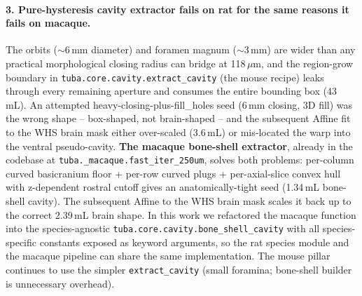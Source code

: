 \documentclass{compactarticle}
\begin{document}
\paragraph{3. Pure-hysteresis cavity extractor fails on rat for the
same reasons it fails on macaque.} The orbits (${\sim}6$\,mm
diameter) and foramen magnum (${\sim}3$\,mm) are wider than any
practical morphological closing radius can bridge at 118\,$\mu$m,
and the region-grow boundary in
\texttt{tuba.core.cavity.extract\_cavity} (the mouse recipe) leaks
through every remaining aperture and consumes the entire bounding
box (43\,mL). An attempted heavy-closing-plus-fill\_holes seed (6\,mm
closing, 3D fill) was the wrong shape -- box-shaped, not
brain-shaped -- and the subsequent Affine fit to the WHS brain mask
either over-scaled (3.6\,mL) or mis-located the warp into the
ventral pseudo-cavity. \textbf{The macaque bone-shell extractor},
already in the codebase at
\texttt{tuba.\_macaque.\allowbreak fast\_iter\_250um}, solves both
problems: per-column curved basicranium floor + per-row curved
plugs + per-axial-slice convex hull with z-dependent rostral cutoff
gives an anatomically-tight seed (1.34\,mL bone-shell cavity). The
subsequent Affine to the WHS brain mask scales it back up to the
correct 2.39\,mL brain shape. In this work we refactored the
macaque function into the species-agnostic
\texttt{tuba.core.cavity.\allowbreak bone\_shell\_cavity} with all
species-specific constants exposed as keyword arguments, so the
rat species module and the macaque pipeline can share the same
implementation. The mouse pillar continues to use the simpler
\texttt{extract\_cavity} (small foramina; bone-shell builder is
unnecessary overhead).
\end{document}
